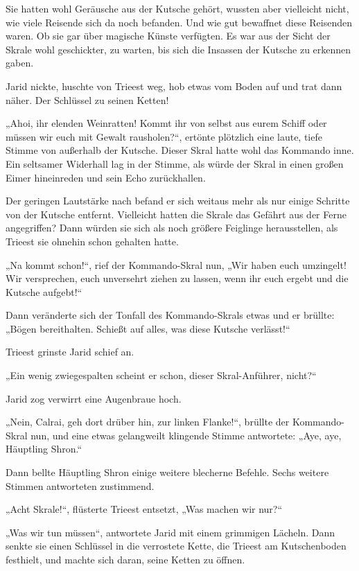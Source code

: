 Sie hatten wohl Geräusche aus der Kutsche gehört, wussten aber vielleicht nicht, wie viele Reisende sich da noch befanden. Und wie gut bewaffnet diese Reisenden waren. Ob sie gar über magische Künste verfügten. Es war aus der Sicht der Skrale wohl geschickter, zu warten, bis sich die Insassen der Kutsche zu erkennen gaben.

Jarid nickte, huschte von Trieest weg, hob etwas vom Boden auf und trat dann näher. Der Schlüssel zu seinen Ketten!

„Ahoi, ihr elenden Weinratten! Kommt ihr von selbst aus eurem Schiff oder müssen wir euch mit Gewalt rausholen?“, ertönte plötzlich eine laute, tiefe Stimme von außerhalb der Kutsche. Dieser Skral hatte wohl das Kommando inne. Ein seltsamer Widerhall lag in der Stimme, als würde der Skral in einen großen Eimer hineinreden und sein Echo zurückhallen.

Der geringen Lautstärke nach befand er sich weitaus mehr als nur einige Schritte von der Kutsche entfernt. Vielleicht hatten die Skrale das Gefährt aus der Ferne angegriffen? Dann würden sie sich als noch größere Feiglinge herausstellen, als Trieest sie ohnehin schon gehalten hatte.

„Na kommt schon!“, rief der Kommando-Skral nun, „Wir haben euch umzingelt! Wir versprechen, euch unversehrt ziehen zu lassen, wenn ihr euch ergebt und die Kutsche aufgebt!“

Dann veränderte sich der Tonfall des Kommando-Skrals etwas und er brüllte: „Bögen bereithalten. Schießt auf alles, was diese Kutsche verlässt!“

Trieest grinste Jarid schief an.

„Ein wenig zwiegespalten scheint er schon, dieser Skral-Anführer, nicht?“

Jarid zog verwirrt eine Augenbraue hoch.

„Nein, Calrai, geh dort drüber hin, zur linken Flanke!“, brüllte der Kommando-Skral nun, und eine etwas gelangweilt klingende Stimme antwortete: „Aye, aye, Häuptling Shron.“

Dann bellte Häuptling Shron einige weitere blecherne Befehle. Sechs weitere Stimmen antworteten zustimmend.

„Acht Skrale!“, flüsterte Trieest entsetzt, „Was machen wir nur?“

„Was wir tun müssen“, antwortete Jarid mit einem grimmigen Lächeln. Dann senkte sie einen Schlüssel in die verrostete Kette, die Trieest am Kutschenboden festhielt, und machte sich daran, seine Ketten zu öffnen.

